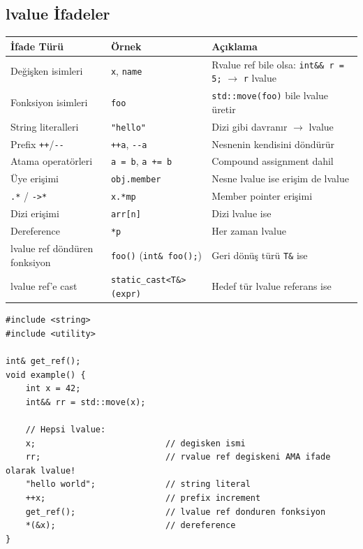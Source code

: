 \documentclass[a4paper,12pt]{article}
\begin{document}
\subsection{lvalue İfadeler}

\begin{table}[h]
\centering
\small
\begin{tabular}{@{}p{4cm}p{4cm}p{6cm}@{}}
\toprule
\textbf{İfade Türü} & \textbf{Örnek} & \textbf{Açıklama} \\
\midrule
Değişken isimleri & \texttt{x}, \texttt{name} & Rvalue ref bile olsa: \texttt{int\&\& r = 5;} $\rightarrow$ \texttt{r} lvalue \\
Fonksiyon isimleri & \texttt{foo} & \texttt{std::move(foo)} bile lvalue üretir \\
String literalleri & \texttt{"hello"} & Dizi gibi davranır $\rightarrow$ lvalue \\
Prefix \texttt{++}/\texttt{-{}-} & \texttt{++a}, \texttt{-{}-a} & Nesnenin kendisini döndürür \\
Atama operatörleri & \texttt{a = b}, \texttt{a += b} & Compound assignment dahil \\
Üye erişimi & \texttt{obj.member} & Nesne lvalue ise erişim de lvalue \\
\texttt{.*} / \texttt{->*} & \texttt{x.*mp} & Member pointer erişimi \\
Dizi erişimi & \texttt{arr[n]} & Dizi lvalue ise \\
Dereference & \texttt{*p} & Her zaman lvalue \\
lvalue ref döndüren fonksiyon & \texttt{foo()} (\texttt{int\& foo();}) & Geri dönüş türü \texttt{T\&} ise \\
lvalue ref'e cast & \texttt{static\_cast<T\&>(expr)} & Hedef tür lvalue referans ise \\
\bottomrule
\end{tabular}
\end{table}

\begin{lstlisting}
#include <string>
#include <utility>

int& get_ref();
void example() {
    int x = 42;
    int&& rr = std::move(x);

    // Hepsi lvalue:
    x;                          // degisken ismi
    rr;                         // rvalue ref degiskeni AMA ifade olarak lvalue!
    "hello world";              // string literal
    ++x;                        // prefix increment
    get_ref();                  // lvalue ref donduren fonksiyon
    *(&x);                      // dereference
}
\end{lstlisting}
\end{document}
